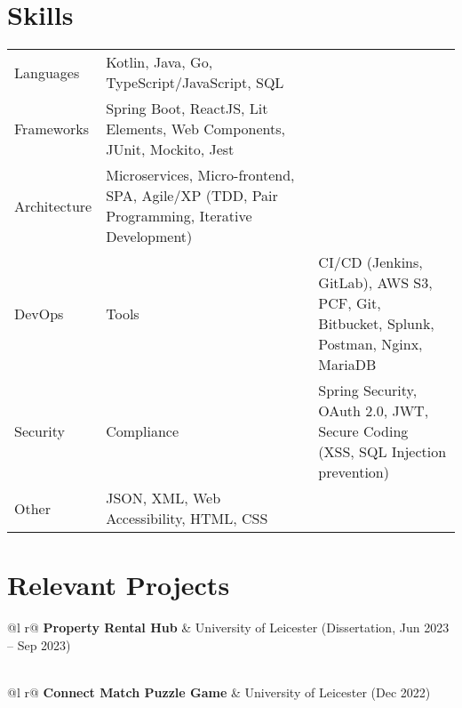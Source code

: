 \documentclass[a4paper,12pt]{article}
\begin{document}
\section{Skills}
\begin{tabularx}{\linewidth}{@{}l X@{}}
Languages & Kotlin, Java, Go, TypeScript/JavaScript, SQL \\
Frameworks & Spring Boot, ReactJS, Lit Elements, Web Components, JUnit, Mockito, Jest \\
Architecture & Microservices, Micro-frontend, SPA, Agile/XP (TDD, Pair Programming, Iterative Development) \\
DevOps & Tools & CI/CD (Jenkins, GitLab), AWS S3, PCF, Git, Bitbucket, Splunk, Postman, Nginx, MariaDB \\
Security & Compliance & Spring Security, OAuth 2.0, JWT, Secure Coding (XSS, SQL Injection prevention) \\
Other & JSON, XML, Web Accessibility, HTML, CSS \\
\end{tabularx}

\section{Relevant Projects}

\begin{tabularx}{\linewidth}{ @{}l r@{} }
\textbf{Property Rental Hub} & \hfill University of Leicester (Dissertation, Jun 2023 -- Sep 2023) \\
 \\
\end{tabularx}

\vspace{5pt}
\begin{tabularx}{\linewidth}{ @{}l r@{} }
\textbf{Connect Match Puzzle Game} & \hfill University of Leicester (Dec 2022) \\
 \\
\end{tabularx}
\end{document}
